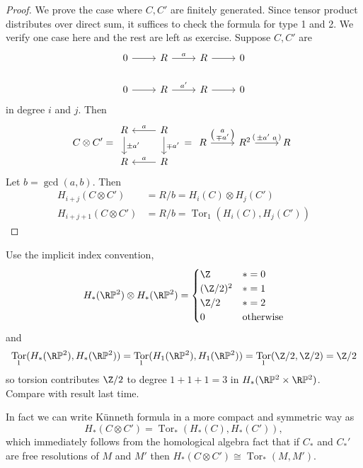 \documentclass[a4paper]{article}
\renewcommand*{\P}{\mathbb{P}}
\DeclareMathOperator{\Tor}{Tor} %
\begin{document}
\begin{proof}
  We prove the case where \(C, C'\) are finitely generated. Since tensor product distributes over direct sum, it suffices to check the formula for type 1 and 2. We verify one case here and the rest are left as exercise. Suppose \(C, C'\) are
  \[
    \begin{tikzcd}
      0 \ar[r] & R \ar[r, "a"] & R \ar[r] & 0 \\
      0 \ar[r] & R \ar[r, "a'"] & R \ar[r] & 0
    \end{tikzcd}
  \]
  in degree \(i\) and \(j\). Then
  \[
    C \otimes C' =
    \begin{tikzcd}
      R \ar[d, "\pm a'"] & R \ar[d, "\mp a'"] \ar[l, "a"'] \\
      R & R \ar[l, "a"']
    \end{tikzcd}
    =
    \begin{tikzcd}[ampersand replacement=\&]
      R \ar[r, "\begin{psmallmatrix} a \\ \mp a' \end{psmallmatrix}"] \& R^2 \ar[r, "{\begin{psmallmatrix} \pm a' & a \end{psmallmatrix}}"] \& R
    \end{tikzcd}
  \]
  Let \(b = \gcd(a, b)\). Then
  \begin{align*}
    H_{i + j}(C \otimes C') &= R/b = H_i(C) \otimes H_j(C') \\
    H_{i + j + 1}(C \otimes C') &= R/b = \Tor_1(H_i(C), H_j(C'))
  \end{align*}
\end{proof}

\begin{eg}
  Use the implicit index convention,
  \[
    H_*(\R\P^2) \otimes H_*(\R\P^2) =
    \begin{cases}
      \Z & * = 0 \\
      (\Z/2)^2 & * = 1 \\
      \Z/2 & * = 2 \\
      0 & \text{otherwise}
    \end{cases}
  \]
  and
  \[
    \Tor_1(H_*(\R\P^2), H_*(\R\P^2))
    = \Tor_1(H_1(\R\P^2), H_1(\R\P^2))
    = \Tor_1(\Z/2, \Z/2)
    = \Z/2
  \]
  so torsion contributes \(\Z/2\) to degree \(1 + 1 + 1 = 3\) in \(H_*(\R\P^2 \times \R\P^2)\). Compare with result last time.
\end{eg}

In fact we can write Künneth formula in a more compact and symmetric way as
\[
  H_*(C \otimes C') = \Tor_*(H_*(C), H_*(C')),
\]
which immediately follows from the homological algebra fact that if \(C_*\) and \(C_*'\) are free resolutions of \(M\) and \(M'\) then \(H_*(C \otimes C') \cong \Tor_*(M, M')\).
\end{document}
